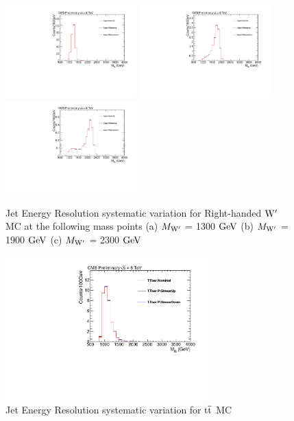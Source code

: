 \begin{figure}[htcb]
\begin{center}
\includegraphics[width=0.45\textwidth]{AN-13-004/figs/Signal_M1300_PtSmearing}
\includegraphics[width=0.45\textwidth]{AN-13-004/figs/Signal_M1900_PtSmearing}
\includegraphics[width=0.45\textwidth]{AN-13-004/figs/Signal_M2300_PtSmearing}
\caption{
Jet Energy Resolution systematic variation for Right-handed $\mathrm{W}^\prime$ MC at the following mass points
(a) $M_{\mathrm{W}^\prime}$ = 1300$~\mathrm{GeV}$ 
(b) $M_{\mathrm{W}^\prime}$ = 1900$~\mathrm{GeV}$
(c) $M_{\mathrm{W}^\prime}$ = 2300$~\mathrm{GeV}$ 
}
\label{figs:signalJER}
\end{center}
\end{figure}

\begin{figure}[htcb]
\begin{center}
\includegraphics[width=0.7\textwidth]{AN-13-004/figs/TTbar_PtSmearing}
\caption{Jet Energy Resolution systematic variation for $\mathrm{t\overline{t}}$ MC}
\label{figs:ttbarJER}
\end{center}
\end{figure}

